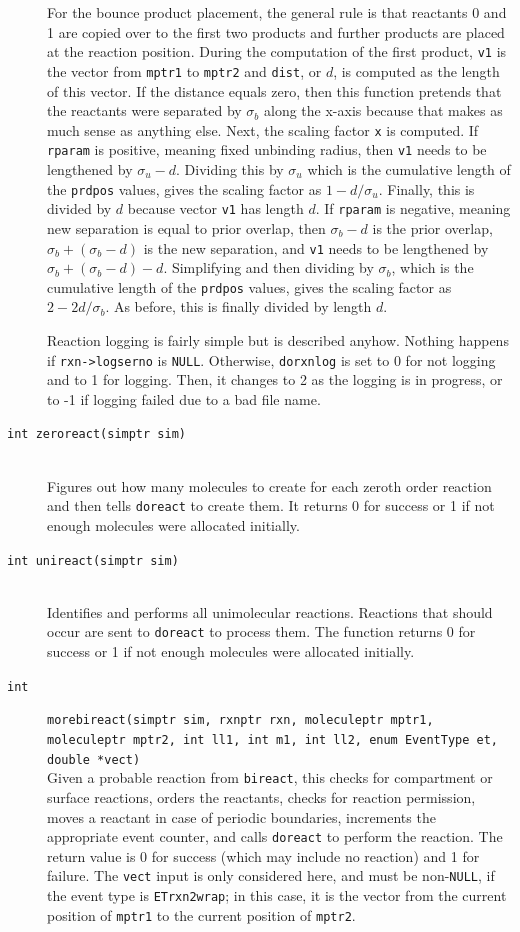 \documentclass {scrbook}
\newcommand {\ttt} {\texttt}
\begin{document}
\begin{description}
For the bounce product placement, the general rule is that reactants 0 and 1 are copied over to the first two products and further products are placed at the reaction position. During the computation of the first product, \ttt{v1} is the vector from \ttt{mptr1} to \ttt{mptr2} and \ttt{dist}, or $d$, is computed as the length of this vector. If the distance equals zero, then this function pretends that the reactants were separated by $\sigma_b$ along the x-axis because that makes as much sense as anything else. Next, the scaling factor \ttt{x} is computed. If \ttt{rparam} is positive, meaning fixed unbinding radius, then \ttt{v1} needs to be lengthened by $\sigma_u-d$. Dividing this by $\sigma_u$ which is the cumulative length of the \ttt{prdpos} values, gives the scaling factor as $1-d/\sigma_u$. Finally, this is divided by $d$ because vector \ttt{v1} has length $d$. If \ttt{rparam} is negative, meaning new separation is equal to prior overlap, then $\sigma_b-d$ is the prior overlap, $\sigma_b+(\sigma_b-d)$ is the new separation, and \ttt{v1} needs to be lengthened by $\sigma_b+(\sigma_b-d)-d$. Simplifying and then dividing by $\sigma_b$, which is the cumulative length of the \ttt{prdpos} values, gives the scaling factor as $2-2d/\sigma_b$. As before, this is finally divided by length $d$.

Reaction logging is fairly simple but is described anyhow. Nothing happens if \ttt{rxn->logserno} is \ttt{NULL}. Otherwise, \ttt{dorxnlog} is set to 0 for not logging and to 1 for logging. Then, it changes to 2 as the logging is in progress, or to -1 if logging failed due to a bad file name.

\item[\ttt{int zeroreact(simptr sim)}]
\hfill \\
Figures out how many molecules to create for each zeroth order reaction and then tells \ttt{doreact} to create them. It returns 0 for success or 1 if not enough molecules were allocated initially.

\item[\ttt{int unireact(simptr sim)}]
\hfill \\
Identifies and performs all unimolecular reactions. Reactions that should occur are sent to \ttt{doreact} to process them. The function returns 0 for success or 1 if not enough molecules were allocated initially.

\item[\ttt{int}]
\ttt{morebireact(simptr sim, rxnptr rxn, moleculeptr mptr1, moleculeptr mptr2, int ll1, int m1, int ll2, enum EventType et, double *vect)} \\
Given a probable reaction from \ttt{bireact}, this checks for compartment or surface reactions, orders the reactants, checks for reaction permission, moves a reactant in case of periodic boundaries, increments the appropriate event counter, and calls \ttt{doreact} to perform the reaction. The return value is 0 for success (which may include no reaction) and 1 for failure. The \ttt{vect} input is only considered here, and must be non-\ttt{NULL}, if the event type is \ttt{ETrxn2wrap}; in this case, it is the vector from the current position of \ttt{mptr1} to the current position of \ttt{mptr2}.


\end{description}
\end{document}
